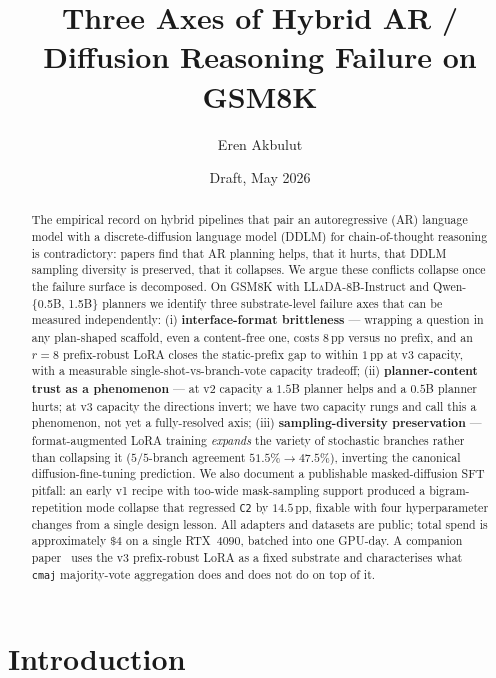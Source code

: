 \documentclass[11pt]{article}
\title{Three Axes of Hybrid AR / Diffusion Reasoning Failure on GSM8K}
\author{Eren Akbulut}
\date{Draft, May 2026}
\newcommand{\code}[1]{\texttt{#1}}
\newcommand{\LLaDA}{\textsc{LLaDA}}
\newcommand{\ctwo}{\code{C2}}
\newcommand{\cmaj}{\code{cmaj}}
\begin{document}
\maketitle

\begin{abstract}
The empirical record on hybrid pipelines that pair an autoregressive
(AR) language model with a discrete-diffusion language model (DDLM)
for chain-of-thought reasoning is contradictory: papers find that AR
planning helps, that it hurts, that DDLM sampling diversity is
preserved, that it collapses. We argue these conflicts collapse once
the failure surface is decomposed. On GSM8K with \LLaDA{}-8B-Instruct
and Qwen-\{0.5B, 1.5B\} planners we identify three substrate-level
failure axes that can be measured independently:
(i) \textbf{interface-format brittleness} --- wrapping a question in
any plan-shaped scaffold, even a content-free one, costs $8$\,pp
versus no prefix, and an $r{=}8$ prefix-robust LoRA closes the
static-prefix gap to within $1$\,pp at v3 capacity, with a measurable
single-shot-vs-branch-vote capacity tradeoff;
(ii) \textbf{planner-content trust as a phenomenon} --- at v2 capacity
a $1.5$B planner helps and a $0.5$B planner hurts; at v3 capacity the
directions invert; we have two capacity rungs and call this a
phenomenon, not yet a fully-resolved axis;
(iii) \textbf{sampling-diversity preservation} --- format-augmented
LoRA training \emph{expands} the variety of stochastic branches
rather than collapsing it ($5/5$-branch agreement
$51.5\% \to 47.5\%$), inverting the canonical
diffusion-fine-tuning prediction. We also document a publishable
masked-diffusion SFT pitfall: an early v1 recipe with too-wide
mask-sampling support produced a bigram-repetition mode collapse
that regressed \ctwo{} by $14.5$\,pp, fixable with four hyperparameter
changes from a single design lesson. All adapters and datasets are
public; total spend is approximately $\$4$ on a single RTX~$4090$,
batched into one GPU-day. A companion paper~\cite{paperB} uses the
v3 prefix-robust LoRA as a fixed substrate and characterises what
\cmaj{} majority-vote aggregation does and does not do on top of it.
\end{abstract}

\section{Introduction}

\end{document}
